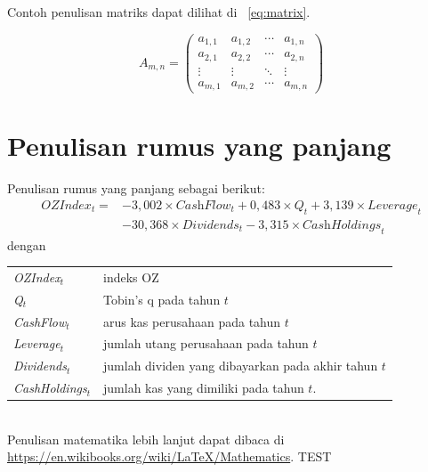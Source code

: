 Contoh penulisan matriks dapat dilihat di \equ~\eqref{eq:matrix}.

\begin{equation}
A_{m,n} = 
 \begin{pmatrix}
  a_{1,1} & a_{1,2} & \cdots & a_{1,n} \\
  a_{2,1} & a_{2,2} & \cdots & a_{2,n} \\
  \vdots  & \vdots  & \ddots & \vdots  \\
  a_{m,1} & a_{m,2} & \cdots & a_{m,n} 
 \end{pmatrix}
 \label{eq:matrix}
\end{equation}
\section{Penulisan rumus yang panjang}
\label{sec:longEqu}
Penulisan rumus yang panjang sebagai berikut:
\begin{equation}
\begin{split}
\textit{OZIndex}_t =& -3,002 \times \textit{CashFlow}_t + 0,483 \times Q_t + 
3,139 \times \textit{Leverage}_t   \\
	& -30,368 \times \textit{Dividends}_t - 3,315 \times \textit{CashHoldings}_t
\end{split}
\label{eq:3-1}
\end{equation}
dengan 

\begin{tabular}{l@{~:~}l}
\textit{OZIndex}$_t$ & indeks OZ \\
\textit{Q}$_t$ & Tobin's q pada tahun $t$ \\
\textit{CashFlow}$_t$ & arus kas perusahaan pada tahun $t$ \\
\textit{Leverage}$_t$ & jumlah utang perusahaan pada tahun $t$ \\
\textit{Dividends}$_t$ & jumlah dividen yang dibayarkan pada akhir tahun $t$ \\
\textit{CashHoldings}$_t$ & jumlah kas yang dimiliki pada tahun $t$. \\
\end{tabular}\\

\noindent Penulisan matematika lebih lanjut dapat dibaca di \url{https://en.wikibooks.org/wiki/LaTeX/Mathematics}.
TEST

